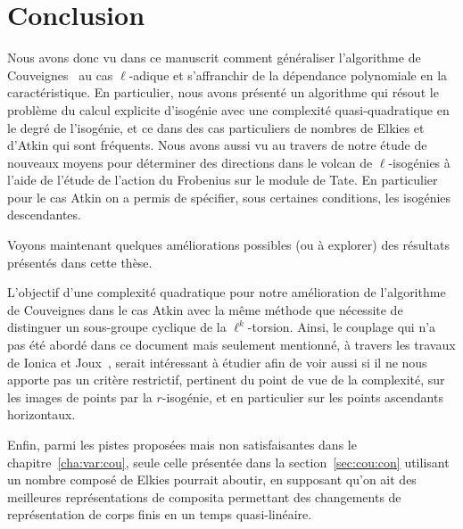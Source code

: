 \documentclass[10pt,a4paper]{book}
\theoremstyle{plain}
\theoremstyle{definition}
\theoremstyle{definition}
\theoremstyle{definition}
\theoremstyle{definition}
\theoremstyle{definition}
\theoremstyle{remark}
\theoremstyle{remark}
\theoremstyle{definition}
\begin{document}
\chapter*{Conclusion}

Nous avons donc vu dans ce manuscrit comment généraliser l'algorithme de 
Couveignes~\cite{Couveignes96} au cas $\ell$-adique et s'affranchir de la 
dépendance polynomiale en la caractéristique. En particulier, nous avons 
présenté un algorithme qui résout le problème du calcul explicite d'isogénie 
avec une complexité quasi-quadratique en le degré de l'isogénie, et ce 
dans des cas particuliers de nombres de Elkies et d'Atkin qui sont fréquents. 
Nous avons aussi vu au travers de notre étude de nouveaux 
moyens pour déterminer des directions dans le volcan de $\ell$-isogénies à 
l'aide de l'étude de l'action du Frobenius sur le module de Tate. En 
particulier pour le cas Atkin on a permis de spécifier, sous certaines 
conditions, les isogénies descendantes.

Voyons maintenant quelques améliorations possibles (ou à explorer) des 
résultats présentés dans cette thèse.


L'objectif d'une complexité quadratique pour notre amélioration de l'algorithme
de Couveignes dans le cas Atkin avec la même méthode que \cite{Couveignes96} 
nécessite de distinguer un sous-groupe cyclique de la $\ell^k$-torsion.
Ainsi, le couplage qui n'a pas été abordé dans ce document mais seulement 
mentionné, à travers les travaux de Ionica et Joux~\cite{Ionica-Joux10},
serait intéressant à étudier afin de voir aussi si il ne nous apporte pas un 
critère restrictif, pertinent du point de vue de la complexité, sur les images 
de points par la $r$-isogénie, et en particulier sur les points ascendants 
horizontaux.

Enfin, parmi les pistes proposées mais non satisfaisantes dans le 
chapitre~\ref{cha:var:cou}, seule celle présentée dans la 
section~\ref{sec:cou:con} utilisant un nombre composé de Elkies pourrait 
aboutir, en supposant qu'on ait des meilleures représentations de composita 
permettant des changements de représentation de corps finis en un temps 
quasi-linéaire.
\end{document}
